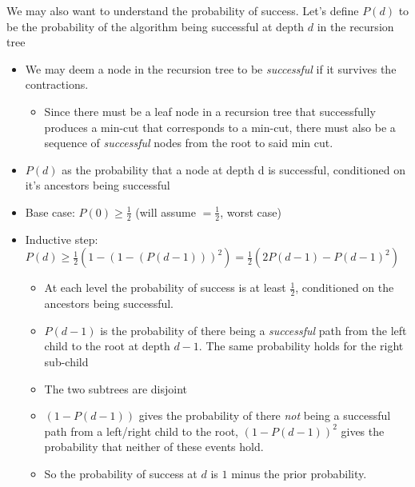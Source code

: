 \documentclass[../notes.tex]{subfiles}
\begin{document}
\begin{theorem}

    We may also want to understand the probability of success. Let's define $ P(d) $ to be the probability of the algorithm being successful at depth $ d $ in the recursion tree

\begin{itemize}
    \item We may deem a node in the recursion tree to be \textit{successful} if it survives the contractions.
        \begin{itemize}
            \item Since there must be a leaf node in a recursion tree that successfully produces a min-cut that corresponds to a min-cut, there must also be a sequence of \textit{successful} nodes from the root to said min cut.
        \end{itemize}
    \item $ P(d) $ as the probability that a node at depth d is successful, conditioned on it's ancestors being successful
\end{itemize}

\begin{itemize}
    \item Base case: $ P(0) \ge \frac{1}{2} $ (will assume $ = \frac{1}{2} $, worst case)
    \item Inductive step: $ P(d) \ge \frac{1}{2} ( 1- (1-(P(d-1)))^2 ) = \frac{1}{2} (2P(d-1) - P(d-1)^2) $ 
      \begin{itemize}
        \item At each level the probability of success is at least $ \frac{1}{2}$, conditioned on the ancestors being successful.
        \item $ P(d-1) $ is the probability of there being a \textit{successful} path from the left child to the root at depth $ d-1 $. The same probability holds for the right sub-child
        \item The two subtrees are disjoint
        \item $ (1 - P(d-1)) $ gives the probability of there \textit{not} being a successful path from a left/right child to the root, $ (1-P(d-1))^2 $ gives the probability that neither of these events hold.
        \item So the probability of success at $ d $ is $ 1 $ minus the prior probability.
      \end{itemize}
\end{itemize}


\end{theorem}
\end{document}
